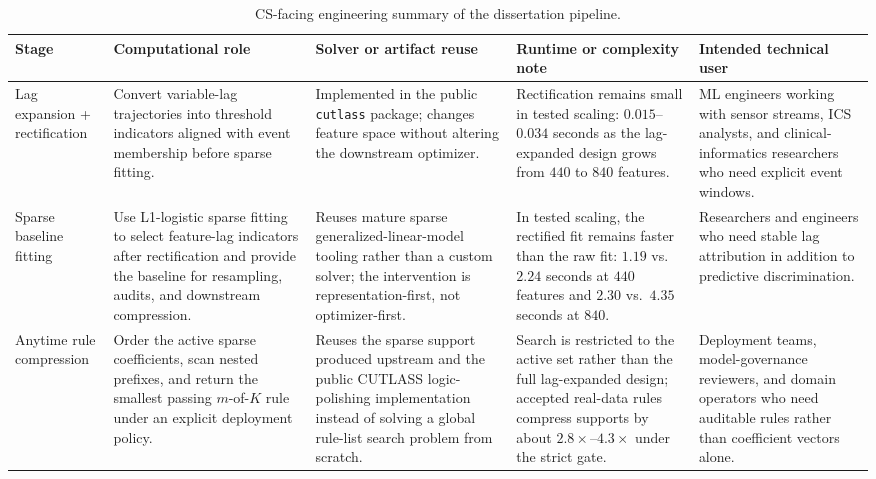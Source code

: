 \begin{table}[tbh]
    \caption[CS-facing engineering summary of the pipeline.]{CS-facing engineering summary of the dissertation pipeline.}
    \label{tab:engineering_summary}
    \centering
        {\scriptsize
        \setlength{\tabcolsep}{2pt}
        \renewcommand{\arraystretch}{0.95}
        \begin{tabularx}{\textwidth}{>{\RaggedRight\arraybackslash}p{}>{\RaggedRight\arraybackslash}X>{\RaggedRight\arraybackslash}X>{\RaggedRight\arraybackslash}X>{\RaggedRight\arraybackslash}p{}}
            Stage & Computational role & Solver or artifact reuse & Runtime or complexity note & Intended technical user \\ \hline
            Lag expansion + rectification & Convert variable-lag trajectories into threshold indicators aligned with event membership before sparse fitting. & Implemented in the public \texttt{cutlass} package; changes feature space without altering the downstream optimizer. & Rectification remains small in tested scaling: $0.015$--$0.034$ seconds as the lag-expanded design grows from $440$ to $840$ features. & ML engineers working with sensor streams, ICS analysts, and clinical-informatics researchers who need explicit event windows. \\ \hline
            Sparse baseline fitting & Use L1-logistic sparse fitting to select feature-lag indicators after rectification and provide the baseline for resampling, audits, and downstream compression. & Reuses mature sparse generalized-linear-model tooling rather than a custom solver; the intervention is representation-first, not optimizer-first. & In tested scaling, the rectified fit remains faster than the raw fit: $1.19$ vs.\ $2.24$ seconds at $440$ features and $2.30$ vs.\ $4.35$ seconds at $840$. & Researchers and engineers who need stable lag attribution in addition to predictive discrimination. \\ \hline
            Anytime rule compression & Order the active sparse coefficients, scan nested prefixes, and return the smallest passing $m$-of-$K$ rule under an explicit deployment policy. & Reuses the sparse support produced upstream and the public CUTLASS logic-polishing implementation instead of solving a global rule-list search problem from scratch. & Search is restricted to the active set rather than the full lag-expanded design; accepted real-data rules compress supports by about $2.8\times$--$4.3\times$ under the strict gate. & Deployment teams, model-governance reviewers, and domain operators who need auditable rules rather than coefficient vectors alone. \\ \hline

\end{tabularx}}
\end{table}
